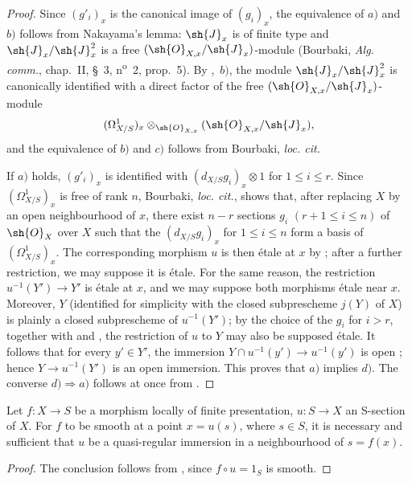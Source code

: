 \begin{proof}
Since $(g'_i)_x$ is the canonical image of $(g_i)_x$, the equivalence of $a)$ and $b)$ follows from Nakayama's lemma: $\sh{J}_x$ is of finite type and $\sh{J}_x/\sh{J}_x^2$ is a free $(\sh{O}_{X,x}/\sh{J}_x)$-module  (Bourbaki, \emph{Alg. comm.}, chap.~II, \S~3, n\textsuperscript{o}~2, prop.~5).
By ,~$b)$, the module $\sh{J}_x/\sh{J}_x^2$ is canonically identified with a direct factor of the free $(\sh{O}_{X,x}/\sh{J}_x)$-module
\[
  (\Omega^1_{X/S})_x\otimes_{\sh{O}_{X,x}}(\sh{O}_{X,x}/\sh{J}_x),
\]
and the equivalence of $b)$ and $c)$ follows from Bourbaki, \emph{loc. cit.}

If $a)$ holds, $(g'_i)_x$ is identified with $(d_{X/S}g_i)_x\otimes1$ for $1\leq i\leq r$.
Since $(\Omega^1_{X/S})_x$ is free of rank $n$, Bourbaki, \emph{loc. cit.}, shows that, after replacing $X$ by an open neighbourhood of $x$, there exist $n-r$ sections $g_i$ $(r+1\leq i\leq n)$ of $\sh{O}_X$ over $X$ such that the $(d_{X/S}g_i)_x$ for $1\leq i\leq n$ form a basis of $(\Omega^1_{X/S})_x$.
The corresponding morphism $u$ is then \'etale at $x$ by ; after a further restriction, we may suppose it is \'etale.
For the same reason, the restriction $u^{-1}(Y')\to Y'$ is \'etale at $x$, and we may suppose both morphisms \'etale near $x$.
Moreover, $Y$ (identified for simplicity with the closed subprescheme $j(Y)$ of $X$) is plainly a closed subprescheme of $u^{-1}(Y')$; by the choice of the $g_i$ for $i>r$, together with  and , the restriction of $u$ to $Y$ may also be supposed \'etale.
It follows that for every $y'\in Y'$, the immersion
$Y\cap u^{-1}(y')\to u^{-1}(y')$ is open ; hence $Y\to u^{-1}(Y')$ is an open immersion.
This proves that $a)$ implies $d)$.
The converse $d)\Rightarrow a)$ follows at once from .
\end{proof}

\begin{corollary}[17.12.3]
\label{IV.17.12.3}
Let $f:X\to S$ be a morphism locally of finite presentation, $u:S\to X$ an S-section of $X$.
For $f$ to be smooth at a point $x=u(s)$, where $s\in S$, it is necessary and sufficient that $u$ be a quasi-regular immersion in a neighbourhood of $s=f(x)$.
\end{corollary}

\begin{proof}
The conclusion follows from , since $f\circ u=1_S$ is smooth.
\end{proof}

